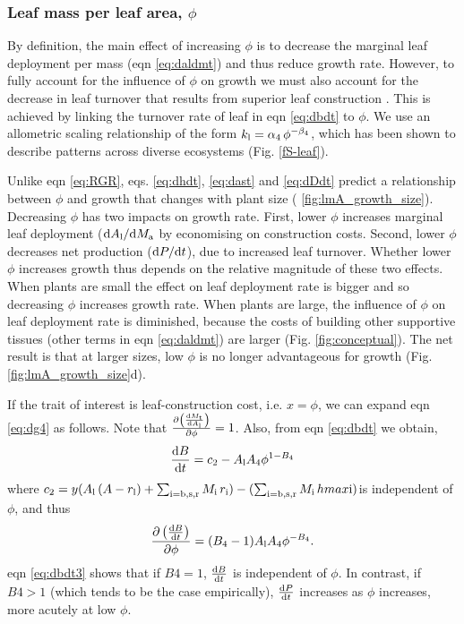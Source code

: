 \documentclass[a4paper,11pt]{article}
\begin{document}
\citet{Wenk-2015}

\subsubsection{Leaf mass per leaf area, $\phi$}

By definition, the main effect of increasing $\phi$ is to decrease the marginal leaf deployment per mass (eqn \ref{eq:daldmt}) and thus reduce growth rate. However, to fully account for the influence of $\phi$ on growth we must also account for the decrease in leaf turnover that results from superior leaf construction \citep{Wright-2004}. This is achieved by linking the turnover rate of leaf in eqn \ref{eq:dbdt} to $\phi$. We use an allometric scaling relationship of the form $k_{\rm l}=\alpha_4 \, \phi^{-\beta_4}$, which has been shown to describe patterns across diverse ecosystems \citep{Wright-2004} (Fig. \ref{fS-leaf}).


Unlike eqn \ref{eq:RGR}, eqs. \ref{eq:dhdt}, \ref{eq:dast} and \ref{eq:dDdt} predict a relationship between $\phi$ and growth that changes with plant size ( \ref{fig:lmA_growth_size}). Decreasing $\phi$ has two impacts on growth rate. First, lower $\phi$ increases marginal leaf deployment (${\rm d}A_{\rm l} / {\rm d}M_{\rm a}$ by economising on construction costs. Second, lower $\phi$ decreases net production (${\rm d}P / {\rm d}t$), due to increased leaf turnover. Whether lower $\phi$ increases growth thus depends on the relative magnitude of these two effects. When plants are small the effect on leaf deployment rate is bigger and so decreasing $\phi$ increases growth rate. When plants are large, the influence of $\phi$ on leaf deployment rate is diminished, because the costs of building other supportive tissues (other terms in eqn \ref{eq:daldmt}) are larger (Fig. \ref{fig:conceptual}). The net result is that at larger sizes, low $\phi$ is no longer advantageous for growth (Fig. \ref{fig:lmA_growth_size}d).

If the trait of interest is leaf-construction cost, i.e. $x=\phi$, we can expand eqn \ref{eq:dg4} as follows. Note that $\frac{\partial \left(\frac{{\rm d}M_\textrm{t}} {{\rm d}A_{\rm l}}\right)}{\partial \phi} = 1$. Also, from eqn \ref{eq:dbdt} we obtain,
\begin{equation}\label{eq:dbdt2}
\frac{{\rm d}B}{{\rm d}t} = c_2 - A_{\rm l} A_4 \phi ^{1-B_4}
\end{equation}
where $c_2 = y ( A_{\rm l} \, (A - r_{\rm l}) + \sum_\textrm{i=b,s,r}{M_\textrm{i} \, r_\textrm{i}}) - (\sum_\textrm{i=b,s,r}{M_\textrm{i} \, hmax\textrm{i}})$is independent of $\phi$, and thus
\begin{equation}\label{eq:dbdt3}
\frac{\partial \left( \frac{ {\rm d}B} {{\rm d}t}\right)}{\partial \phi}  =
(B_4-1) A_{\rm l} A_4\phi ^{-B_4}.
\end{equation}
eqn \ref{eq:dbdt3} shows that if $B4=1$, $\frac{ {\rm d}B} {{\rm d}t}$ is independent of $\phi$. In contrast, if $B4>1$ (which tends to be the case empirically), $\frac{ \textrm{d}P} {{\rm d}t}$ increases as $\phi$ increases, more acutely at low $\phi$.
\end{document}
